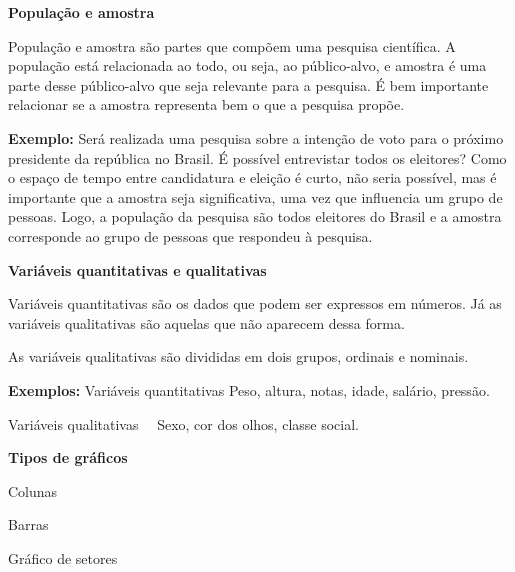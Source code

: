 
\textbf{População e amostra}

População e amostra são partes que compõem uma pesquisa científica. A
população está relacionada ao todo, ou seja, ao público-alvo, e amostra
é uma parte desse público-alvo que seja relevante para a pesquisa. É bem
importante relacionar se a amostra representa bem o que a pesquisa
propõe.

\textbf{Exemplo:} Será realizada uma pesquisa sobre a intenção de voto
para o próximo presidente da república no Brasil. É possível entrevistar
todos os eleitores? Como o espaço de tempo entre candidatura e eleição é
curto, não seria possível, mas é importante que a amostra seja
significativa, uma vez que influencia um grupo de pessoas. Logo, a
população da pesquisa são todos eleitores do Brasil e a amostra
corresponde ao grupo de pessoas que respondeu à pesquisa.

\textbf{Variáveis quantitativas e qualitativas~}

Variáveis quantitativas são os dados que podem ser expressos em números.
Já as variáveis qualitativas são aquelas que não aparecem dessa forma.

As variáveis qualitativas são divididas em dois grupos, ordinais e
nominais.

\textbf{Exemplos:} Variáveis quantitativas \rightarrow Peso, altura,
notas, idade, salário, pressão.

Variáveis qualitativas \rightarrow \ \ Sexo, cor dos olhos, classe
social.

\textbf{Tipos de gráficos}

Colunas


Barras


Gráfico de setores

